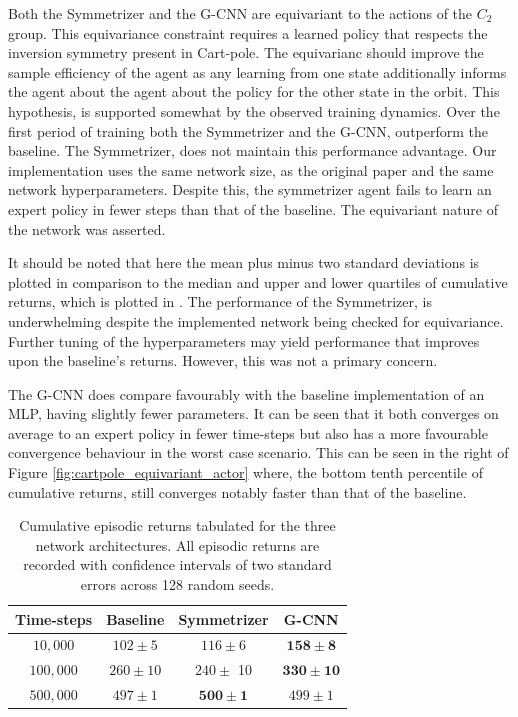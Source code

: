 Both the Symmetrizer and the G-CNN are equivariant to the actions of the $C_2$ group. This equivariance constraint requires a learned policy that respects the inversion symmetry present in Cart-pole. The equivarianc  should improve the sample efficiency of the agent as any learning from one state additionally informs the agent about the agent about the policy for the other state in the orbit. This hypothesis, is supported somewhat by the observed training dynamics. Over the first period of training both the Symmetrizer and the G-CNN, outperform the baseline. The Symmetrizer, does not maintain this performance advantage. Our implementation uses the same network size, as the original paper and the same network hyperparameters. Despite this, the symmetrizer agent fails to learn an expert policy in fewer steps than that of the baseline. The equivariant nature of the network was asserted.

It should be noted that here the mean plus minus two standard deviations is plotted in comparison to the median and upper and lower quartiles of cumulative returns, which is plotted in \cite{vanderpol2020mdp}. The performance of the Symmetrizer, is underwhelming despite the implemented network being checked for equivariance. Further tuning of the hyperparameters may yield performance that improves upon the baseline's returns. However, this was not a primary concern.

The G-CNN does compare favourably with the baseline implementation of an MLP, having slightly fewer parameters. It can be seen that it both converges on average to an expert policy in fewer time-steps but also has a more favourable convergence behaviour in the worst case scenario. This can be seen in the right of Figure \ref{fig:cartpole_equivariant_actor} where, the bottom tenth percentile of cumulative returns, still converges notably faster than that of the baseline.

\begin{table}
	\centering
	\begin{tabular}{|c|c|c|c|}
		\hline
		Time-steps & Baseline     & Symmetrizer          & G-CNN                 \\
		\hline
		$10, 000$  & $102 \pm 5$  & $116 \pm 6$          & $\mathbf{158 \pm 8}$  \\
		$100, 000$ & $260 \pm 10$ & $240 \pm$ 10         & $\mathbf{330 \pm 10}$ \\
		$500,000$  & $497 \pm 1$  & $\mathbf{500 \pm 1}$ & $499 \pm 1$           \\
		\hline
	\end{tabular}
	\caption{Cumulative episodic returns tabulated for the three network architectures. All episodic returns are recorded with confidence intervals of two standard errors across 128 random seeds.}
	\label{tab:actor-critic}
\end{table}

